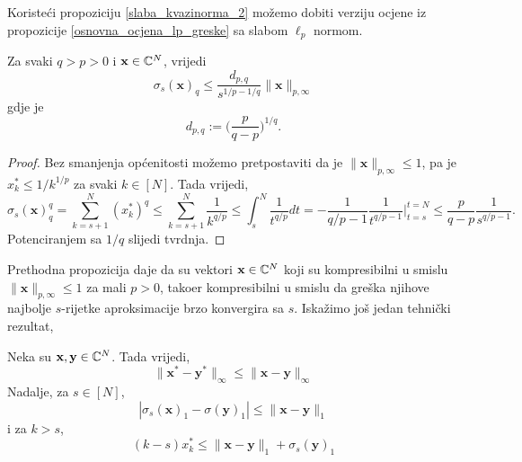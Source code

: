 \documentclass[a4paper,twoside,12pt]{memoir} %
\newcommand{\vect}[1]{\mathbf{#1}}
\renewcommand{\vec}{\vect}
\newcommand{\norm}[1]{\|{#1}\|}
\begin{document}
Koriste\'ci propoziciju \eqref{slaba_kvazinorma_2} mo\v{z}emo dobiti verziju ocjene iz propozicije \eqref{osnovna_ocjena_lp_greske} sa slabom $\ell_p$ normom.
\begin{prop}
    Za svaki $q>p>0$ i $\vec{x} \in \C^N$, vrijedi
    \begin{equation*}
        \sigma_s(\vec{x})_q \leq \frac{d_{p,q}}{s^{1/p-1/q}}\|\vec{x}\|_{p, \infty}
    \end{equation*}
    gdje je
    \begin{equation*}
        d_{p,q} := \big( \frac{p}{q-p} \big)^{1/q}.
    \end{equation*}
\end{prop}
\begin{proof}
    Bez smanjenja op\'cenitosti mo\v{z}emo pretpostaviti da je $\norm{\vec{x}}_{p,\infty} \leq 1$, pa je $x_k^* \leq 1/k^{1/p}$ za svaki $k \in [N]$. Tada vrijedi,
    \begin{equation*}
    \sigma_s(\vec{x})^q_q = \sum_{k=s+1}^{N} (x_k^*)^q \leq \sum_{k=s+1}^N \frac{1}{k^{q/p}} \leq \int_s^N \frac{1}{t^{q/p}} dt = - \frac{1}{q/p-1} \frac{1}{t^{q/p-1}}\bigg\rvert^{t=N}_{t=s} \leq \frac{p}{q-p} \frac{1}{s^{q/p-1}}.
    \end{equation*}
    Potenciranjem sa $1/q$ slijedi tvrdnja.
\end{proof}
Prethodna propozicija daje da su vektori $\vec{x} \in \C^N$ koji su kompresibilni u smislu $\norm{\vec{x}}_{p, \infty} \leq 1$ za mali $p>0$, tako\dj er kompresibilni u smislu da gre\v{s}ka njihove najbolje $s$-rijetke aproksimacije brzo konvergira sa $s$. Iska\v{z}imo jo\v{s} jedan tehni\v{c}ki rezultat,
\begin{lem}
    Neka su $\vec{x}, \vec{y} \in \C^N$. Tada vrijedi,
    \begin{equation} \label{nerastuci_poredak_ocjena_1}
        \norm{\vec{x}^* - \vec{y}^*}_{\infty} \leq \norm{\vec{x} - \vec{y}}_{\infty}
    \end{equation}
    Nadalje, za $s \in [N]$,
    \begin{equation}\label{nerastuci_poredak_ocjena_2}
        |\sigma_s(\vec{x})_1 - \sigma(\vec{y})_1| \leq \norm{\vec{x} - \vec{y}}_1
    \end{equation}
    i za $k>s$,
    \begin{equation}\label{nerastuci_poredak_ocjena_3}
        (k-s)x_k^* \leq \norm{\vec{x} - \vec{y}}_1 + \sigma_s(\vec{y})_1
    \end{equation}
\end{lem}
\end{document}

